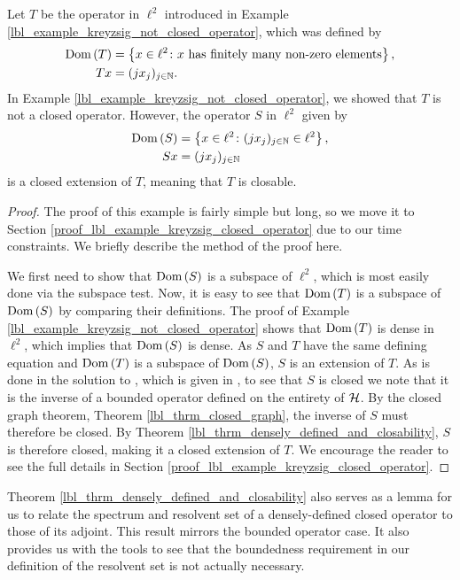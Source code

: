 \begin{example}\label{lbl_example_kreyzsig_closed_operator}
  Let $T$ be the operator in $\ell^2$ introduced in Example \eqref{lbl_example_kreyzsig_not_closed_operator}, which was defined by
  \begin{align*}
    \operatorname{Dom}\left(T\right) &= \left\{x \in \ell^2 \colon \text{$x$ has finitely many non-zero elements}\right\}, \\
    Tx &= (jx_j)_{j \in \mathbb{N}}.
  \end{align*}
  In Example \eqref{lbl_example_kreyzsig_not_closed_operator}, we showed that $T$ is not a closed operator. However, the operator $S$ in $\ell^2$ given by
  \begin{align*}
    \operatorname{Dom}\left(S\right) &= \left\{x \in \ell^2 \colon (jx_j)_{j \in \mathbb{N}} \in \ell^2\right\}, \\
    Sx &= (jx_j)_{j \in \mathbb{N}}
  \end{align*}
  is a closed extension of $T$, meaning that $T$ is closable.
\end{example}
\begin{proof}
  The proof of this example is fairly simple but long, so we move it to Section \eqref{proof_lbl_example_kreyzsig_closed_operator} due to our time constraints. We briefly describe the method of the proof here.

  \medskip

  We first need to show that $\operatorname{Dom}\left(S\right)$ is a subspace of $\ell^2$, which is most easily done via the subspace test. Now, it is easy to see that $\operatorname{Dom}\left(T\right)$ is a subspace of $\operatorname{Dom}\left(S\right)$ by comparing their definitions. The proof of Example \eqref{lbl_example_kreyzsig_not_closed_operator} shows that $\operatorname{Dom}\left(T\right)$ is dense in $\ell^2$, which implies that $\operatorname{Dom}\left(S\right)$ is dense. As $S$ and $T$ have the same defining equation and $\operatorname{Dom}\left(T\right)$ is a subspace of $\operatorname{Dom}\left(S\right)$, $S$ is an extension of $T$. As is done in the solution to {\cite[Problem 5, Chapter 10.3]{kreyszig}},  which is given in {\cite[p.667]{kreyszig}}, to see that $S$ is closed we note that it is the inverse of a bounded operator defined on the entirety of $\mathcal{H}$. By the closed graph theorem, Theorem \eqref{lbl_thrm_closed_graph}, the inverse of $S$ must therefore be closed. By Theorem \eqref{lbl_thrm_densely_defined_and_closability}, $S$ is therefore closed, making it a closed extension of $T$. We encourage the reader to see the full details in Section \eqref{proof_lbl_example_kreyzsig_closed_operator}.
\end{proof}

Theorem \eqref{lbl_thrm_densely_defined_and_closability} also serves as a lemma for us to relate the spectrum and resolvent set of a densely-defined closed operator to those of its adjoint. This result mirrors the bounded operator case. It also provides us with the tools to see that the boundedness requirement in our definition of the resolvent set is not actually necessary.

